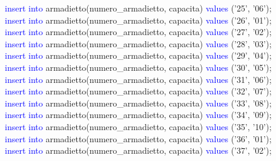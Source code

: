 \documentclass{article}
\begin{document}
\begin{flushleft}
{        \hspace*{0.5em}\textcolor{blue}{insert into} armadietto(numero\_armadietto, capacita) \textcolor{blue}{values} ('25', '06'); \\
        \hspace*{0.5em}\textcolor{blue}{insert into} armadietto(numero\_armadietto, capacita) \textcolor{blue}{values} ('26', '01'); \\
        \hspace*{0.5em}\textcolor{blue}{insert into} armadietto(numero\_armadietto, capacita) \textcolor{blue}{values} ('27', '02'); \\
        \hspace*{0.5em}\textcolor{blue}{insert into} armadietto(numero\_armadietto, capacita) \textcolor{blue}{values} ('28', '03'); \\
        \hspace*{0.5em}\textcolor{blue}{insert into} armadietto(numero\_armadietto, capacita) \textcolor{blue}{values} ('29', '04'); \\
        \hspace*{0.5em}\textcolor{blue}{insert into} armadietto(numero\_armadietto, capacita) \textcolor{blue}{values} ('30', '05'); \\
        \hspace*{0.5em}\textcolor{blue}{insert into} armadietto(numero\_armadietto, capacita) \textcolor{blue}{values} ('31', '06'); \\
        \hspace*{0.5em}\textcolor{blue}{insert into} armadietto(numero\_armadietto, capacita) \textcolor{blue}{values} ('32', '07'); \\
        \hspace*{0.5em}\textcolor{blue}{insert into} armadietto(numero\_armadietto, capacita) \textcolor{blue}{values} ('33', '08'); \\
        \hspace*{0.5em}\textcolor{blue}{insert into} armadietto(numero\_armadietto, capacita) \textcolor{blue}{values} ('34', '09'); \\
        \hspace*{0.5em}\textcolor{blue}{insert into} armadietto(numero\_armadietto, capacita) \textcolor{blue}{values} ('35', '10'); \\
        \hspace*{0.5em}\textcolor{blue}{insert into} armadietto(numero\_armadietto, capacita) \textcolor{blue}{values} ('36', '01'); \\
        \hspace*{0.5em}\textcolor{blue}{insert into} armadietto(numero\_armadietto, capacita) \textcolor{blue}{values} ('37', '02'); \\
}
\end{flushleft}
\end{document}
